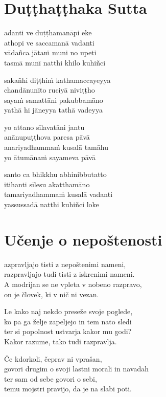 

\cleartoverso
\chapter*{Duṭṭhaṭṭhaka Sutta}

adanti ve duṭṭhamanāpi eke\\
athopi ve saccamanā vadanti\\
vādañca jātaṁ muni no upeti\\
tasmā munī natthi khilo kuhiñci

sakañhi diṭṭhiṁ kathamaccayeyya\\
chandānunīto ruciyā niviṭṭho\\
sayaṁ samattāni pakubbamāno\\
yathā hi jāneyya tathā vadeyya

yo attano sīlavatāni jantu\\
anānupuṭṭhova paresa pāvā\\
anariyadhammaṁ kusalā tamāhu\\
yo ātumānaṁ sayameva pāvā

santo ca bhikkhu abhinibbutatto\\
itihanti sīlesu akatthamāno\\
tamariyadhammaṁ kusalā vadanti\\
yassussadā natthi kuhiñci loke


\cleartorecto
\chapter{Učenje o nepoštenosti}

azpravljajo tisti z nepoštenimi nameni,\\
razpravljajo tudi tisti z iskrenimi nameni.\\
A modrijan se ne vpleta v nobeno razpravo,\\
on je človek, ki v nič ni vezan.

Le kako naj nekdo preseže svoje poglede,\\
ko pa ga želje zapeljejo in tem nato sledi\\
ter si popolnost ustvarja kakor mu godi?\\
Kakor razume, tako tudi razpravlja.

Če kdorkoli, čeprav ni vprašan,\\
govori drugim o svoji lastni morali in navadah\\
ter sam od sebe govori o sebi,\\
temu mojstri pravijo, da je na slabi poti.


